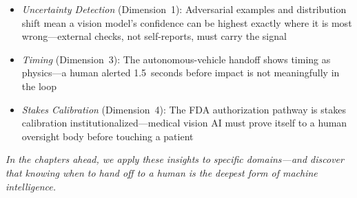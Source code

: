 \begin{itemize}
    \item \textit{Uncertainty Detection} (Dimension~1): Adversarial examples and distribution shift mean a vision model's confidence can be highest exactly where it is most wrong---external checks, not self-reports, must carry the signal
    \item \textit{Timing} (Dimension~3): The autonomous-vehicle handoff shows timing as physics---a human alerted 1.5~seconds before impact is not meaningfully in the loop
    \item \textit{Stakes Calibration} (Dimension~4): The FDA authorization pathway is stakes calibration institutionalized---medical vision AI must prove itself to a human oversight body before touching a patient
\end{itemize}

\noindent\textit{In the chapters ahead, we apply these insights to specific domains---and discover that knowing when to hand off to a human is the deepest form of machine intelligence.}
